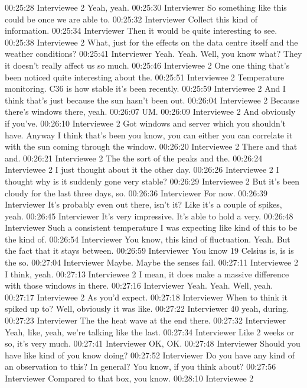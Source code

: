 00:25:28 Interviewee 2 
Yeah, yeah.
00:25:30 Interviewer
So something like this could be once we are able to.
00:25:32 Interviewer
Collect this kind of information.
00:25:34 Interviewer
Then it would be quite interesting to see.
00:25:38 Interviewee 2 
What, just for the effects on the data centre itself and the weather conditions?
00:25:41 Interviewer
Yeah. Yeah. Well, you know what? They it doesn't really affect us so much.
00:25:46 Interviewee 2 
One one thing that's been noticed quite interesting about the.
00:25:51 Interviewee 2 
Temperature monitoring. C36 is how stable it's been recently.
00:25:59 Interviewee 2 
And I think that's just because the sun hasn't been out.
00:26:04 Interviewee 2 
Because there's windows there, yeah.
00:26:07
UM.
00:26:09 Interviewee 2 
And obviously if you've.
00:26:10 Interviewee 2 
Got windows and server which you shouldn't have. Anyway I think that's been you know, you can either you can correlate it with the sun coming through the window.
00:26:20 Interviewee 2 
There and that and.
00:26:21 Interviewee 2 
The the sort of the peaks and the.
00:26:24 Interviewee 2 
I just thought about it the other day.
00:26:26 Interviewee 2 
I thought why is it suddenly gone very stable?
00:26:29 Interviewee 2 
But it's been cloudy for the last three days, so.
00:26:36 Interviewer
For now.
00:26:39 Interviewer
It's probably even out there, isn't it? Like it's a couple of spikes, yeah.
00:26:45 Interviewer
It's very impressive. It's able to hold a very.
00:26:48 Interviewer
Such a consistent temperature I was expecting like kind of this to be the kind of.
00:26:54 Interviewer
You know, this kind of fluctuation. Yeah. But the fact that it stays between.
00:26:59 Interviewer
You know 19 Celsius is, is is the so.
00:27:04 Interviewer
Maybe. Maybe the senses fail.
00:27:11 Interviewee 2 
I think, yeah.
00:27:13 Interviewee 2 
I mean, it does make a massive difference with those windows in there.
00:27:16 Interviewer
Yeah. Yeah. Well, yeah.
00:27:17 Interviewee 2 
As you'd expect.
00:27:18 Interviewer
When to think it spiked up to? Well, obviously it was like.
00:27:22 Interviewer
40 yeah, during.
00:27:23 Interviewer
The the heat wave at the end there.
00:27:32 Interviewer
Yeah, like, yeah, we're talking like the last.
00:27:34 Interviewer
Like 2 weeks or so, it's very much.
00:27:41 Interviewer
OK, OK.
00:27:48 Interviewer
Should you have like kind of you know doing?
00:27:52 Interviewer
Do you have any kind of an observation to this? In general? You know, if you think about?
00:27:56 Interviewer
Compared to that box, you know.
00:28:10 Interviewee 2 
